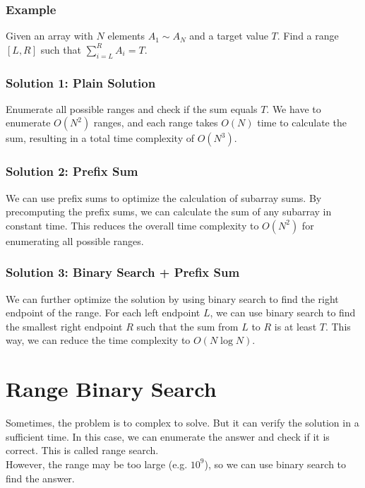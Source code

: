 \documentclass[xcolor=dvipsnames]{beamer}
\begin{document}
    \begin{frame}
        \frametitle{Example}
        Given an array with $N$ elements $A_1\sim A_N$ and a target value $T$. Find a range $[L, R]$ such that $\displaystyle\sum_{i=L}^{R} A_i = T$.\\
    \end{frame}
    \begin{frame}
        \frametitle{Solution 1: Plain Solution}
        Enumerate all possible ranges and check if the sum equals $T$. We have to enumerate $O(N^2)$ ranges, and each range takes $O(N)$ time to calculate the sum, resulting in a total time complexity of $O(N^3)$.\\
    \end{frame}

    \begin{frame}
        \frametitle{Solution 2: Prefix Sum}
        We can use prefix sums to optimize the calculation of subarray sums. By precomputing the prefix sums, we can calculate the sum of any subarray in constant time. This reduces the overall time complexity to $O(N^2)$ for enumerating all possible ranges.\\
    \end{frame}

    \begin{frame}
        \frametitle{Solution 3: Binary Search + Prefix Sum}
        We can further optimize the solution by using binary search to find the right endpoint of the range. For each left endpoint $L$, we can use binary search to find the smallest right endpoint $R$ such that the sum from $L$ to $R$ is at least $T$. This way, we can reduce the time complexity to $O(N \log N)$.\\
    \end{frame}

    \section{Range Binary Search}
    \begin{frame}
        Sometimes, the problem is to complex to solve. But it can verify the solution in a sufficient time. In this case, we can enumerate the answer and check if it is correct. This is called range search.\\
        However, the range may be too large (e.g. $10^9$), so we can use binary search to find the answer.\\
    \end{frame}
\end{document}

